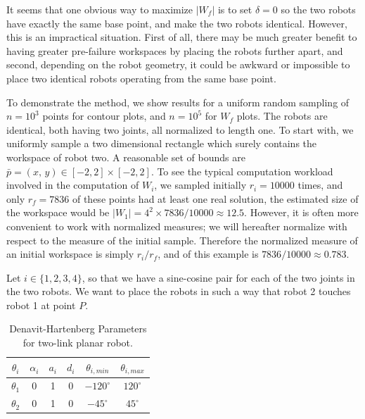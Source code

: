 \documentclass[12pt]{report}
\begin{document}


It seems that one obvious way to maximize $| W_f |$ is to set $\delta =0$ so the two robots have exactly the same base point,  and make the two robots identical. However, this is an impractical situation. First of all, there may be much greater benefit to having greater pre-failure workspaces by placing the robots further apart, and second, depending on the robot geometry, it could be awkward or impossible to place two identical robots operating from the same base point.


To demonstrate the method, we show results for a uniform random sampling of $n = 10^3$ points for contour plots, and $n= 10^5$ for $W_f$ plots.  The robots are identical, both having two joints, all normalized to length one.
To start with, we uniformly sample a two dimensional rectangle which surely contains the workspace of robot two.  A reasonable set of bounds are $\bar{p} = (x,\,y) \in [-2,2]\times[-2,2]$.  To see the typical computation workload involved in the computation of $W_i$, we sampled initially $r_i=10000$ times, and only $r_f=7836$ of these points had at least one real solution, the estimated size of the workspace would be $|W_1| =4^2 \times 7836/10000 \approx 12.5$.  However, it is often more convenient to work with normalized measures; we will hereafter normalize with respect to the measure of the initial sample.  Therefore the normalized measure of an initial workspace is simply $r_i/r_f$, and of this example is $7836/10000 \approx 0.783$.


Let $i \in \{1, 2, 3, 4\}$, so that we have a sine-cosine pair for each of the two joints in the two robots. 
We want to place the robots in such a way that robot 2 touches robot 1 at point $P$. 

\begin{table}
\begin{center}
\caption{Denavit-Hartenberg Parameters for two-link planar robot.}
\label{tab:2ddh}
\begin{tabular}{| c | c | c | c | c | c |}
\hline
$\theta_i$			&	$\alpha_i$			&	$a_i$	&	$d_i$		&  $\theta_{i,min}$	&	$\theta_{i,max}$\\ \hline
$\theta_1$ 		&	0					& 	1		&	0			& $-120^\circ$	& $120^\circ$ \\
$\theta_2$ 		&	0					& 	1		&	0			& $-45^\circ$	& $45^\circ$\\
\hline
\end{tabular}
\end{center}
\end{table}
\end{document}
